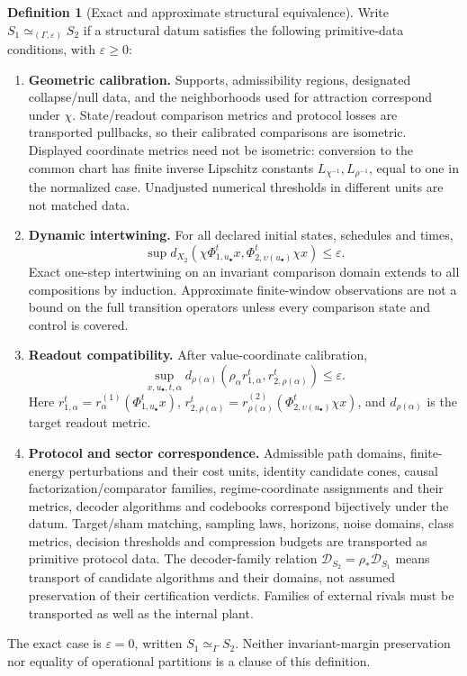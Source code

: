 \documentclass[11pt,a4paper]{article}
\theoremstyle{definition}
\newtheorem{definition}[theorem]{Definition}
\newcommand{\Dec}{\mathscr{D}}
\newcommand{\eps}{\varepsilon}
\begin{document}
\begin{definition}[Exact and approximate structural equivalence]\label{def:equiv}
Write $S_1\simeq_{(\Gamma,\eps)}S_2$ if a structural datum satisfies the following primitive-data conditions, with $\eps\ge0$:
\begin{enumerate}[leftmargin=1.5em]
\item \textbf{Geometric calibration.} Supports, admissibility regions, designated collapse/null data, and the neighborhoods used for attraction correspond under $\chi$. State/readout comparison metrics and protocol losses are transported pullbacks, so their calibrated comparisons are isometric. Displayed coordinate metrics need not be isometric: conversion to the common chart has finite inverse Lipschitz constants $L_{\chi^{-1}},L_{\rho^{-1}}$, equal to one in the normalized case. Unadjusted numerical thresholds in different units are not matched data.
\item \textbf{Dynamic intertwining.} For all declared initial states, schedules and times,
\[
 \sup d_{X_2}(\chi\Phi_{1,u_\bullet}^{t}x,\Phi_{2,\upsilon(u_\bullet)}^{t}\chi x)\le\eps.
\]
Exact one-step intertwining on an invariant comparison domain extends to all compositions by induction. Approximate finite-window observations are not a bound on the full transition operators unless every comparison state and control is covered.
\item \textbf{Readout compatibility.} After value-coordinate calibration,
\[
 \sup_{x,u_\bullet,t,\alpha}d_{\rho(\alpha)}
 (\rho_\alpha r_{1,\alpha}^{t},r_{2,\rho(\alpha)}^{t})\le\eps.
\]
Here $r_{1,\alpha}^{t}=r_\alpha^{(1)}(\Phi_{1,u_\bullet}^t x)$, $r_{2,\rho(\alpha)}^{t}=r_{\rho(\alpha)}^{(2)}(\Phi_{2,\upsilon(u_\bullet)}^t\chi x)$, and $d_{\rho(\alpha)}$ is the target readout metric.
\item \textbf{Protocol and sector correspondence.} Admissible path domains, finite-energy perturbations and their cost units, identity candidate cones, causal factorization/comparator families, regime-coordinate assignments and their metrics, decoder algorithms and codebooks correspond bijectively under the datum. Target/sham matching, sampling laws, horizons, noise domains, class metrics, decision thresholds and compression budgets are transported as primitive protocol data. The decoder-family relation $\Dec_{S_2}=\rho_*\Dec_{S_1}$ means transport of candidate algorithms and their domains, not assumed preservation of their certification verdicts. Families of external rivals must be transported as well as the internal plant.
\end{enumerate}
The exact case is $\eps=0$, written $S_1\simeq_\Gamma S_2$. Neither invariant-margin preservation nor equality of operational partitions is a clause of this definition.
\end{definition}
\end{document}
